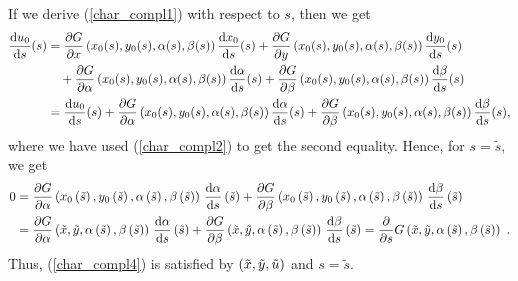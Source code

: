If we derive (\ref{char_compl1}) with respect to $s$, then we get
\begin{align*}
\dydx{u_0}{s}(s)
&= \pdydx{G}{x}\left(x_0(s), y_0(s), \alpha(s), \beta(s)\right)
\dydx{x_0}{s}(s) + \pdydx{G}{y}\left(x_0(s), y_0(s), \alpha(s), \beta(s)\right)
\dydx{y_0}{s}(s) \\
&\quad + \pdydx{G}{\alpha}\left(x_0(s), y_0(s), \alpha(s), \beta(s)\right)
\dydx{\alpha}{s}(s)
+ \pdydx{G}{\beta}\left(x_0(s), y_0(s), \alpha(s), \beta(s)\right)
\dydx{\beta}{s}(s) \\
&= \dydx{u_0}{s}(s)
+ \pdydx{G}{\alpha}\left(x_0(s), y_0(s), \alpha(s), \beta(s)\right)
\dydx{\alpha}{s}(s)
+ \pdydx{G}{\beta}\left(x_0(s), y_0(s), \alpha(s), \beta(s)\right)
\dydx{\beta}{s}(s) ,
\end{align*}
where we have used (\ref{char_compl2}) to get the second equality.  Hence,
for $s=\tilde{s}$, we get
\begin{align*}
0 &= \pdydx{G}{\alpha}\left(x_0\left(\tilde{s}\right),
y_0\left(\tilde{s}\right), \alpha\left(\tilde{s}\right),
\beta\left(\tilde{s}\right)\right)\,\dydx{\alpha}{s}\left(\tilde{s}\right) +
\pdydx{G}{\beta}\left(x_0\left(\tilde{s}\right), y_0\left(\tilde{s}\right),
\alpha\left(\tilde{s}\right), \beta\left(\tilde{s}\right)\right)\,
\dydx{\beta}{s}\left(\tilde{s}\right) \\
&= \pdydx{G}{\alpha}\left(\tilde{x}, \tilde{y},\alpha\left(\tilde{s}\right),
\beta\left(\tilde{s}\right)\right)\, \dydx{\alpha}{s}\left(\tilde{s}\right)
+ \pdydx{G}{\beta}\left(\tilde{x}, \tilde{y},\alpha\left(\tilde{s}\right),
\beta\left(\tilde{s}\right)\right)\, \dydx{\beta}{s}\left(\tilde{s}\right)
= \pdfdx{G}{s}\left(\tilde{x}, \tilde{y}, \alpha\left(\tilde{s}\right),
\beta\left(\tilde{s}\right)\right) \ .
\end{align*}
Thus, (\ref{char_compl4}) is satisfied by
$\DS \left(\tilde{x},\tilde{y},\tilde{u}\right)$
and $s=\tilde{s}$.

